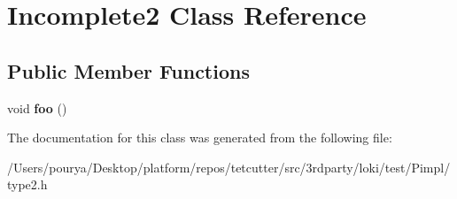 \hypertarget{classIncomplete2}{}\section{Incomplete2 Class Reference}
\label{classIncomplete2}
\subsection*{Public Member Functions}
\begin{DoxyCompactItemize}
\item 
\hypertarget{classIncomplete2_adb43fd46bc4af50b4d48050b5490bdca}{}void {\bfseries foo} ()\label{classIncomplete2_adb43fd46bc4af50b4d48050b5490bdca}

\end{DoxyCompactItemize}


The documentation for this class was generated from the following file\+:\begin{DoxyCompactItemize}
\item 
/\+Users/pourya/\+Desktop/platform/repos/tetcutter/src/3rdparty/loki/test/\+Pimpl/type2.\+h\end{DoxyCompactItemize}
